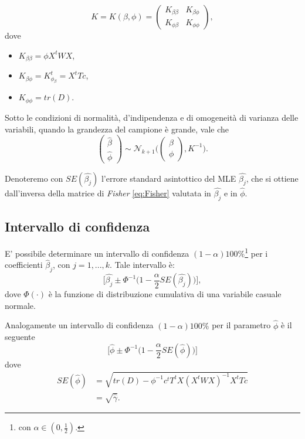 \documentclass[twoside,twocolumn]{article}
\begin{document}
\begin{equation}
 K = K(\beta,\phi) =
 	 \begin{pmatrix} 
 	 	K_{\beta\beta} & K_{\beta\phi}\\
 	 	K_{\phi\beta} & K_{\phi\phi} 
 	 \end{pmatrix}, 
 	 \label{eq:Fisher}
\end{equation}
dove 
\begin{itemize}
	\item $K_{\beta\beta}=\phi X^tWX$,
	\item $K_{\beta\phi}=K_{\phi_\beta}^t=X^tTc$,
	\item $K_{\phi \phi}=tr(D)$.
\end{itemize}

Sotto le condizioni di normalità, d'indipendenza e di omogeneità di varianza delle variabili, quando la grandezza del campione è grande, vale che
$$ \begin{pmatrix}\hat{\beta}\\ \hat{\phi} \end{pmatrix} \sim \mathcal{N}_{k+1}\Bigg(\begin{pmatrix}\beta\\ \phi \end{pmatrix},K^{-1}\Bigg).$$ 

Denoteremo con $SE(\hat{\beta_j})$ l'errore standard asintottico del MLE $\hat{\beta_j}$, che si ottiene dall'inversa della matrice di \emph{Fisher} \eqref{eq:Fisher} valutata in $\hat{\beta_j}$ e in $\hat{\phi}$.

\subsection{Intervallo di confidenza}
E' possibile determinare un intervallo di confidenza $(1-\alpha)100\%$\footnote{con $\alpha \in (0,\frac{1}{2})$.} per i coefficienti $\hat{\beta}_j$, con $j=1,...,k$. Tale intervallo è:
$$ \bigg[\hat{\beta_j} \pm \Phi^{-1}\bigg(1-\frac{\alpha}{2}SE(\hat{\beta_j})\bigg)\bigg], $$
dove $\Phi(\cdot)$ è la funzione di distribuzione cumulativa di una variabile casuale normale. 

Analogamente un intervallo di confidenza $(1-\alpha)100\%$ per il parametro $\hat{\phi}$ è il seguente
$$\bigg[\hat{\phi} \pm \Phi^{-1}\bigg(1-\frac{\alpha}{2}SE(\hat{\phi})\bigg)  \bigg] $$ dove 
\begin{align*}
SE(\hat{\phi})&=\sqrt{tr(D)-\phi^{-1}c^tT^tX(X^tWX)^{-1}X^tTc}\\
&=\sqrt{\hat{\gamma}}.
\end{align*}
\end{document}
